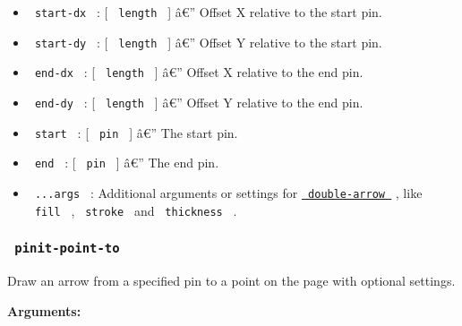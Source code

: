 \begin{itemize}
\tightlist
\item
  \texttt{\ start-dx\ } : {[} \texttt{\ length\ } {]} â€'' Offset X
  relative to the start pin.
\item
  \texttt{\ start-dy\ } : {[} \texttt{\ length\ } {]} â€'' Offset Y
  relative to the start pin.
\item
  \texttt{\ end-dx\ } : {[} \texttt{\ length\ } {]} â€'' Offset X
  relative to the end pin.
\item
  \texttt{\ end-dy\ } : {[} \texttt{\ length\ } {]} â€'' Offset Y
  relative to the end pin.
\item
  \texttt{\ start\ } : {[} \texttt{\ pin\ } {]} â€'' The start pin.
\item
  \texttt{\ end\ } : {[} \texttt{\ pin\ } {]} â€'' The end pin.
\item
  \texttt{\ ...args\ } : Additional arguments or settings for
  \href{https://github.com/typst/packages/raw/main/packages/preview/pinit/0.2.2/\#double-arrow}{\texttt{\ double-arrow\ }}
  , like \texttt{\ fill\ } , \texttt{\ stroke\ } and
  \texttt{\ thickness\ } .
\end{itemize}

\subsubsection{\texorpdfstring{\texttt{\ pinit-point-to\ }}{ pinit-point-to }}\label{pinit-point-to}

Draw an arrow from a specified pin to a point on the page with optional
settings.

\begin{Shaded}
\begin{Highlighting}[]
\end{Highlighting}
\end{Shaded}

\textbf{Arguments:}

